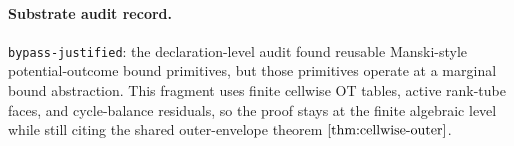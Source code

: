 \paragraph{Substrate audit record.}
\texttt{bypass-justified}: the declaration-level audit found reusable Manski-style potential-outcome bound primitives, but those primitives operate at a marginal bound abstraction.  This fragment uses finite cellwise OT tables, active rank-tube faces, and cycle-balance residuals, so the proof stays at the finite algebraic level while still citing the shared outer-envelope theorem \(\ref{thm:cellwise-outer}\).
